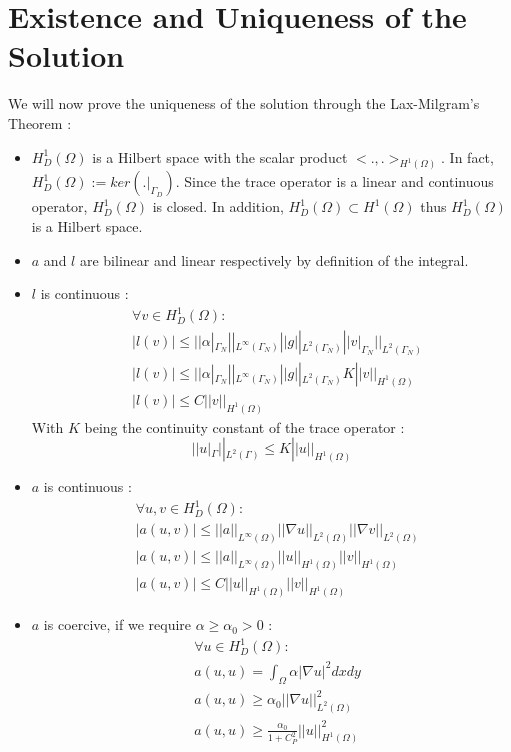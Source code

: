 \documentclass[a4paper]{report}
\begin{document}
\section{Existence and Uniqueness of the Solution}
We will now prove the uniqueness of the solution through the Lax-Milgram's Theorem :
\begin{itemize}
\item $H^1_D(\Omega)$ is a Hilbert space with the scalar product $<.,.>_{H^1(\Omega)}$. In fact, $H^1_D(\Omega):=ker(.|_{\Gamma_D})$. Since the trace operator is a linear and continuous operator, $H^1_D(\Omega)$ is closed. In addition, $H_D^1(\Omega) \subset H^1(\Omega)$ thus $H^1_D(\Omega)$ is a Hilbert space.
\item $a$ and $l$ are bilinear and linear respectively by definition of the integral.
\item $l$ is continuous :
\begin{align*}
&\forall v\in H^1_D(\Omega):\\
&|l(v)|\leq ||\alpha|_{\Gamma_N} ||_{L^\infty(\Gamma_N)}||g||_{L^2(\Gamma_N)}||v|_{\Gamma_N}||_{L^2(\Gamma_N)}\\
&|l(v)| \leq ||\alpha|_{\Gamma_N}||_{L^\infty(\Gamma_N)} ||g||_{L^2(\Gamma_N)} K ||v||_{H^1(\Omega)}\\
&|l(v)| \leq C ||v||_{H^1(\Omega)}
\end{align*}
With $K$ being the continuity constant of the trace operator :
\[
||u|_\Gamma||_{L^2(\Gamma)} \leq K ||u||_{H^1(\Omega)}
\]
\item $a$ is continuous :
\begin{align*}
&\forall u,v \in H^1_D(\Omega):\\
&|a(u,v)|\leq  ||a||_{L^\infty(\Omega)} || \nabla u||_{L^2(\Omega)} || \nabla v||_{L^2(\Omega)}\\
&|a(u,v)| \leq  ||a||_{L^\infty(\Omega)} ||u||_{H^1(\Omega)} ||v||_{H^1(\Omega)}\\
&|a(u,v)| \leq C || u||_{H^1(\Omega)} || v||_{H^1(\Omega)}
\end{align*}
\item $a$ is coercive, if we require $\alpha \geq \alpha_0 > 0$ :
\begin{align*}
& \forall u \in H^1_D(\Omega):\\
&a(u,u)=\int_\Omega \alpha |\nabla u|^2dxdy\\
&a(u,u) \geq \alpha_0 ||\nabla u||^2_{L^2(\Omega)}\\
&a(u,u) \geq \frac{\alpha_0}{1+C^2_P} ||u||^2_{H^1(\Omega)}\\

\end{align*}
\end{itemize}
\end{document}
